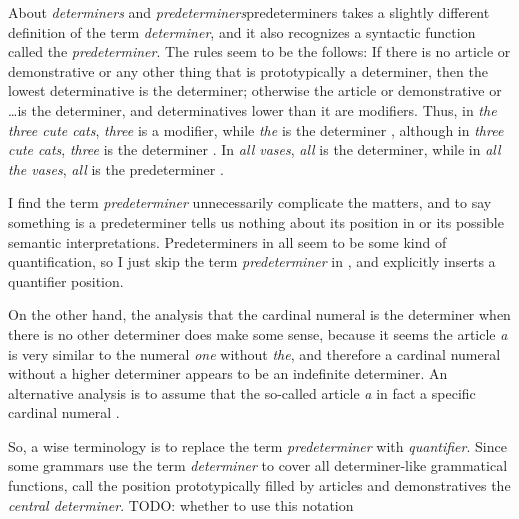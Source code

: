 \documentclass[UTF8, a4paper, oneside, scheme=plain]{ctexrep}
\newcommand*{\citesec}[1]{\S~{#1}}
\newcommand*{\citepage}[1]{p.~{#1}}
\newcommand*{\term}[1]{\emph{#1}}
\newcommand{\corpus}[1]{\emph{#1}}
\begin{document}
\begin{infobox}{About \term{determiners} and \term{predeterminers}}{predeterminers}
    \citet[\citepage{331}]{cgel} takes a slightly different definition of the term \term{determiner},
    and it also recognizes a syntactic function called the \term{predeterminer}.
    The rules seem to be the follows: 
    If there is no article or demonstrative or any other thing that is prototypically a determiner,
    then the lowest determinative is the determiner;
    otherwise the article or demonstrative or \dots is the determiner,
    and determinatives lower than it are modifiers.
    Thus, in \corpus{the three cute cats},
    \corpus{three} is a modifier, while \corpus{the} is the determiner 
    \citep[\citepage{356}, {[4ii]}]{cgel},
    although in \corpus{three cute cats}, \corpus{three} is the determiner 
    \citep[\citepage{355}, {[2ii]}]{cgel}.
    In \corpus{all vases}, \corpus{all} is the determiner,
    while in \corpus{all the vases}, \corpus{all} is the predeterminer
    \citep[\citepage{356}, {[4i]}]{cgel}.

    I find the term \term{predeterminer} unnecessarily complicate the matters,
    and to say something is a predeterminer 
    tells us nothing about its position in 
    or its possible semantic interpretations.
    Predeterminers in \citet[\citepage{433}]{cgel}
    all seem to be some kind of quantification,
    so I just skip the term \term{predeterminer} in ,
    and explicitly inserts a quantifier position.

    On the other hand, the analysis that the cardinal numeral is the determiner
    when there is no other determiner
    does make some sense,
    because it seems the article \corpus{a} is very similar to 
    the numeral \corpus{one} without \corpus{the},
    and therefore a cardinal numeral without a higher determiner 
    appears to be an indefinite determiner.
    An alternative analysis is to assume that 
    the so-called article \corpus{a} in fact a specific cardinal numeral
    \citep[\citesec{2.5}]{lyons1999definiteness}.

    So, a wise terminology is to replace the term \term{predeterminer} with \term{quantifier}.
    Since some grammars use the term \term{determiner} to cover all determiner-like grammatical functions,
    \citet[\citepage{253}]{quirk1985} call the position prototypically filled by 
    articles and demonstratives 
    the \term{central determiner}. TODO: whether to use this notation
\end{infobox}
\end{document}
